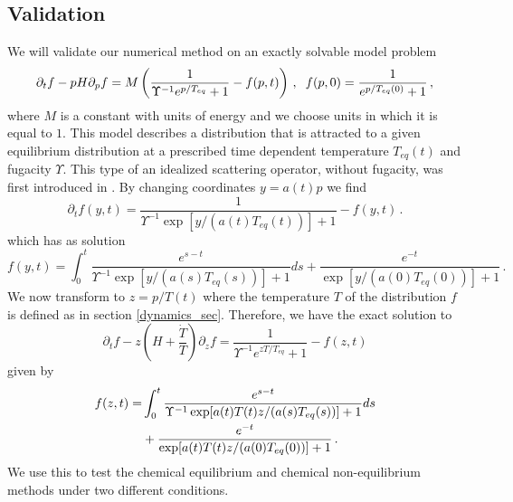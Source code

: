 \subsection{Validation}\label{validation}
We will validate our numerical method on an exactly solvable model problem
\begin{equation}\label{toy_eq}
\partial_t f-pH \partial_p f=M\left(\frac{1}{\Upsilon^{-1}e^{p/T_{eq}}+1}-f(p,t)\right)\,, \hspace{2mm} f(p,0)=\frac{1}{e^{p/T_{eq}(0)}+1}\,,
\end{equation}
where $M$ is a constant with units of energy and we choose units in which it is equal to $1$. This model describes a distribution that is attracted to a given equilibrium distribution at a prescribed time dependent temperature $T_{eq}(t)$ and fugacity $\Upsilon$. This type of an idealized scattering operator, without fugacity, was first introduced in \cite{Anderson_Witting}. By changing coordinates $y=a(t)p$ we find
\begin{equation}\label{free_stream_toy}
\partial_tf(y,t)=\frac{1}{\Upsilon^{-1}\exp[y/(a(t)T_{eq}(t))]+1}-f(y,t)\,.
\end{equation}
 which has as solution
\begin{equation}\label{exact_sol}
f(y,t)=\int_0^t\frac{e^{s-t}}{\Upsilon^{-1}\exp[y/(a(s)T_{eq}(s))]+1}ds+\frac{e^{-t}}{\exp[y/(a(0)T_{eq}(0))]+1}\,.
\end{equation}
We now transform to $z=p/T(t)$ where the temperature $T$ of the distribution $f$ is defined as in section \ref{dynamics_sec}.  Therefore, we have the exact solution to
\begin{equation}\label{k_eq_toy}
\partial_tf-z\left(H+\frac{\dot{T}}{T}\right)\partial_zf=\frac{1}{\Upsilon^{-1}e^{zT/T_{eq}}+1}-f(z,t)
\end{equation}
given by
\begin{align}
f(z,t)=&\int_0^t\frac{e^{s-t}}{\Upsilon^{-1}\exp[a(t)T(t)z/(a(s)T_{eq}(s))]+1}ds\\
&+\frac{e^{-t}}{\exp[a(t)T(t)z/(a(0)T_{eq}(0))]+1}\,.\notag
\end{align}
We use this to test the chemical equilibrium and chemical non-equilibrium methods under two different conditions. 

